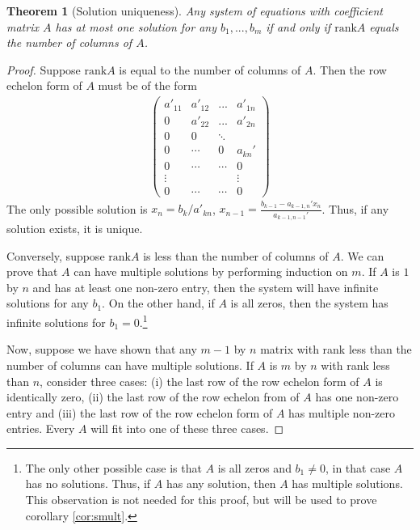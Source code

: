 \documentclass[12pt,reqno]{amsart}
\newcommand{\rank}{\mathrm{rank}}
\newtheorem{theorem}{Theorem}[section]
\theoremstyle{definition}
\begin{document}
\begin{theorem}[Solution uniqueness] \label{thm:sunique}
  Any system of equations with coefficient matrix $A$ has at most one
  solution for any $b_1, ... , b_m$ if and only if $\rank A$ equals
  the number of columns of $A$. 
\end{theorem}
\begin{proof}
  Suppose $\rank A$ is equal to the number of columns of $A$. Then the
  row echelon form of $A$ must be of the form
  \begin{align*}
    \begin{pmatrix}
      a'_{11} & a'_{12} & ... & a'_{1n} \\
      0 & a'_{22} & ... & a'_{2n}  \\
      0 & 0 & \ddots \\
      0 & \cdots & 0 & a_{kn}' \\
      0 & \cdots & \cdots & 0 \\
      \vdots &  &  & \vdots \\
      0 & \cdots & \cdots & 0 
    \end{pmatrix}
  \end{align*}
  The only possible solution is $x_n = b_k/a'_{kn}$, $x_{n-1} =
  \frac{b_{k-1} - a_{k-1,n}' x_n}{a_{k-1,n-1}'}$. Thus, if any
  solution exists, it is unique. 

  Conversely, suppose $\rank A$ is less than the number of columns of
  $A$. We can prove that $A$ can have multiple solutions by performing
  induction on $m$. If $A$ is $1$ by $n$ and has at least one non-zero
  entry, then the system will have infinite solutions for any
  $b_1$. On the other hand, if $A$ is all zeros, then the system has
  infinite solutions for $b_1 = 0$.\footnote{The only other possible
    case is that $A$ is all zeros and $b_1 \neq 0$, in that case $A$
    has no solutions. Thus, if $A$ has any solution, then $A$ has
    multiple solutions. This observation is not needed for this proof,
    but will be used to prove corollary \ref{cor:smult}.}
  
  Now, suppose we have shown that any $m-1$ by $n$ matrix with rank
  less than the number of columns can have multiple solutions. If $A$
  is $m$ by $n$ with rank less than $n$, consider three cases: (i) the
  last row of the row echelon form of $A$ is identically zero, (ii)
  the last row of the row echelon from of $A$ has one non-zero entry
  and (iii) the last row of the row echelon form of $A$ has multiple
  non-zero entries. Every $A$ will fit into one of these three cases.


\end{proof}
\end{document}
